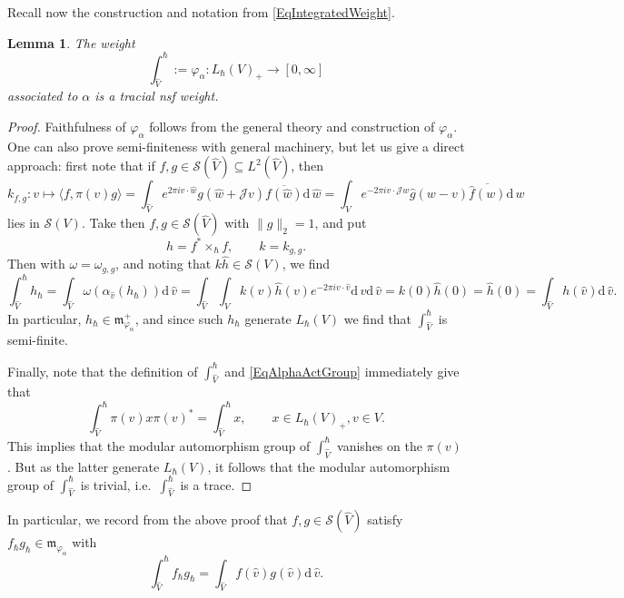 \documentclass[11pt, reqno]{amsart}
\newtheorem{lemma}[theorem]{Lemma}
\theoremstyle{definition}
\numberwithin{equation}{section}
\def\Sc{\mathcal S}
\newcommand{\rd}{\mathrm{d}\!\,}
\newcommand{\mfm}{\mathfrak{m}}
\newcommand{\Jc}{\mathcal{J}}
\begin{document}
Recall now the construction and notation from \eqref{EqIntegratedWeight}. 

\begin{lemma}
The weight
\[
\int_{\hat{V}}^{\hbar} := \varphi_{\alpha}\colon  L_{\hbar}(V)_+ \rightarrow [0,\infty] 
\]
associated to $\alpha$ is a tracial nsf weight. 
\end{lemma}
\begin{proof}
Faithfulness of $\varphi_{\alpha}$ follows from the general theory and construction of $\varphi_{\alpha}$. One can also prove semi-finiteness with general machinery, but let us give a direct approach: first note that if $f,g\in\Sc(\hat{V}) \subseteq L^2(\hat{V})$, then 
\[
k_{f,g}\colon  v \mapsto \langle f,\pi(v)g\rangle = \int_{\hat{V}} e^{2\pi i v\cdot \hat{w}}g(\hat{w}+\Jc v)\overline{f(\hat{w})}\rd \hat{w} = \int_V e^{-2\pi i v\cdot \Jc w}\hat{g}(w-v)\overline{\hat{f}(w)} \rd w
\]
lies in $\Sc(V)$. Take then $f,g \in \Sc(\hat{V})$ with $\|g\|_2 = 1$, and put 
\[
h = f^*\times_{\hbar} f,\qquad k = k_{g,g}.
\]
Then with $\omega = \omega_{g,g}$, and noting that $k\hat{h}\in \Sc(V)$, we find 
\[
\int_{\hat{V}}^{\hbar} h_{\hbar} =  \int_{\hat{V}} \omega(\alpha_{\hat{v}}(h_{\hbar})) \rd \hat{v} =  \int_{\hat{V}} \int_V k(v)\hat{h}(v) e^{-2\pi i v\cdot \hat{v}} \rd v  \rd \hat{v} = k(0)\hat{h}(0) = \hat{h}(0) = \int_{\hat{V}} h(\hat{v})\rd\hat{v}.
\]
In particular, $h_{\hbar} \in \mfm_{\varphi_{\alpha}}^+$, and since such $h_{\hbar}$ generate $L_{\hbar}(V)$ we find that $\int_{\hat{V}}^{\hbar}$ is semi-finite.

Finally, note that the definition of $\int_{\hat{V}}^{\hbar}$ and \eqref{EqAlphaActGroup} immediately give that 
\[
\int_{\hat{V}}^{\hbar}\pi(v)x\pi(v)^*  = \int_{\hat{V}}^{\hbar} x,\qquad x\in L_{\hbar}(V)_+,v\in V. 
\]
This implies that the modular automorphism group of $\int_{\hat{V}}^{\hbar}$ vanishes on the $\pi(v)$. But as the latter generate $L_{\hbar}(V)$, it follows that the modular automorphism group of $\int_{\hat{V}}^{\hbar}$ is trivial, i.e.\ $\int_{\hat{V}}^{\hbar}$ is a trace.
\end{proof}
In particular, we record from the above proof that $f,g \in \Sc(\hat{V})$ satisfy $f_{\hbar}g_{\hbar}\in \mfm_{\varphi_{\alpha}}$ with 
\begin{equation}\label{EqIntegralDef}
\int_{\hat{V}}^{\hbar} f_{\hbar}g_{\hbar} = \int_{\hat{V}}f(\hat{v})g(\hat{v})\rd \hat{v}. 
\end{equation}
\end{document}
